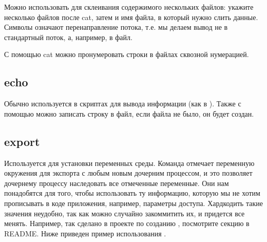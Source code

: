 \documentclass[letterpaper,10pt,russian]{sphinxmanual}
\begin{document}
\sphinxAtStartPar
{}

\sphinxAtStartPar
Можно использовать  для склеивания содержимого нескольких файлов: укажите несколько файлов после cat, затем \sphinxcode{\sphinxupquote{\textgreater{}\textgreater{}}} и имя файла, в который нужно слить данные. Символы \sphinxcode{\sphinxupquote{\textgreater{}\textgreater{}}} означают перенаправление потока, т.е. мы делаем вывод не в стандартный поток, а, например, в файл.

\sphinxAtStartPar
{}

\sphinxAtStartPar
С помощью cat можно пронумеровать строки в файлах сквозной нумерацией.

\sphinxAtStartPar
{}

\sphinxAtStartPar
{}

\sphinxAtStartPar
{}


\subsection{echo}
\label{\detokenize{educational_materials/bash/content:echo}}
\sphinxAtStartPar
Обычно используется в скриптах для вывода информации (как  в ). Также с помощью  можно записать строку в файл, если файла не было, он будет создан.

\sphinxAtStartPar
{}


\subsection{export}
\label{\detokenize{educational_materials/bash/content:export}}
\sphinxAtStartPar
Используется для установки переменных среды. Команда  отмечает переменную окружения для экспорта с любым новым дочерним процессом, и это позволяет дочернему процессу наследовать все отмеченные переменные. Они нам понадобятся для того, чтобы использовать ту информацию, которую мы не хотим прописывать в коде приложения, например, параметры доступа. Хардкодить такие значения неудобно, так как можно случайно закоммитить их, и придется все менять. Например, так сделано в проекте по созданию , посмотрите секцию  в README. Ниже приведен пример использования .
\end{document}
